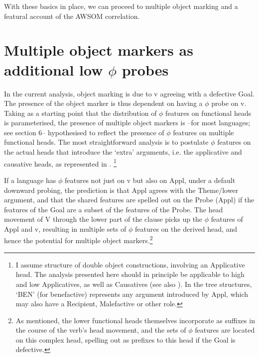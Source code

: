 \documentclass[output=paper
,modfonts
,nonflat]{langsci/langscibook}
\begin{document}
With these basics in place, we can proceed to multiple object marking and a featural account of the AWSOM correlation.

\section{ Multiple object markers as additional low $\phi$ probes}

In the current analysis, object marking is due to v agreeing with a defective Goal. The presence of the object marker is thus dependent on having a $\phi$ probe on v. Taking as a starting point that the distribution of $\phi$ features on functional heads is parameterised, the presence of multiple object markers is –for most languages; see section 6– hypothesised to reflect the presence of $\phi$ features on multiple functional heads. The most straightforward analysis is to postulate $\phi$ features on the actual heads that introduce the ‘extra’ arguments, i.e. the applicative and causative heads, as represented in .{} \footnote{I assume  structure of double object constructions, involving an Applicative head. The analysis presented here should in principle be applicable to high and low Applicatives, as well as Causatives (see also \citealt{Van_der_Wal2017}). In the tree structures, ‘BEN’ (for benefactive) represents any argument introduced by Appl, which may also have a Recipient, Malefactive or other role.}
 
\begin{exe}
\end{exe} 

\newpage If a language has $\phi$ features not just on v but also on Appl, under a default downward probing, the prediction is that Appl agrees with the Theme/lower argument, and that the shared features are spelled out on the Probe (Appl) if the features of the Goal are a subset of the features of the Probe. The head movement of V through the lower part of the clause picks up the $\phi$ features of Appl and v, resulting in multiple sets of $\phi$ features on the derived head, and hence the potential for multiple object markers.\footnote{As mentioned, the lower functional heads themselves incorporate as suffixes in the course of the verb’s head movement, and the sets of $\phi$ features are located on this complex head, spelling out as prefixes to this head if the Goal is defective.} 
\end{document}
